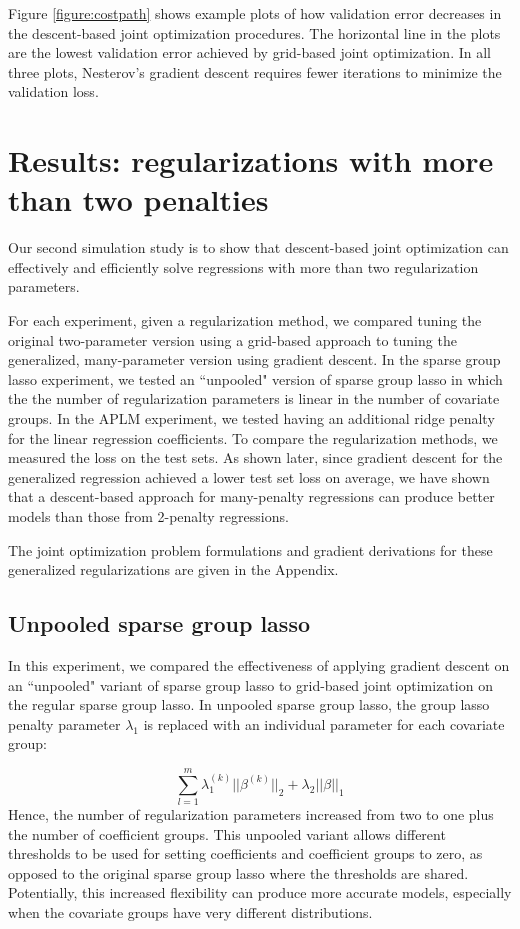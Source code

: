 \documentclass[10pt,letterpaper]{article}
\begin{document}
Figure \ref{figure:costpath} shows example plots of how validation error decreases in the descent-based joint optimization procedures. The horizontal line in the plots are the lowest validation error achieved by grid-based joint optimization. In all three plots, Nesterov's gradient descent requires fewer iterations to minimize the validation loss.

\section{Results: regularizations with more than two penalties}

Our second simulation study is to show that descent-based joint optimization can effectively and efficiently solve regressions with more than two regularization parameters.

For each experiment, given a regularization method, we compared tuning the original two-parameter version using a grid-based approach to tuning the generalized, many-parameter version using gradient descent. In the sparse group lasso experiment, we tested an ``unpooled" version of sparse group lasso in which the the number of regularization parameters is linear in the number of covariate groups. In the APLM experiment, we tested having an additional ridge penalty for the linear regression coefficients. To compare the regularization methods, we measured the loss on the test sets. As shown later, since gradient descent for the generalized regression achieved a lower test set loss on average, we have shown that a descent-based approach for many-penalty regressions can produce better models than those from 2-penalty regressions.

The joint optimization problem formulations and gradient derivations for these generalized regularizations are given in the Appendix.

\subsection{Unpooled sparse group lasso}

In this experiment, we compared the effectiveness of applying gradient descent on an ``unpooled" variant of sparse group lasso to grid-based joint optimization on the regular sparse group lasso. In unpooled sparse group lasso, the group lasso penalty parameter $\lambda_1$ is replaced with an individual parameter for each covariate group:

\begin{equation}
\sum_{l=1}^m \lambda_1^{(k)} \lvert\lvert \beta^{(k)} \rvert \rvert_2
+ \lambda_2 \lvert\lvert \beta \rvert \rvert_1
\end{equation}
Hence, the number of regularization parameters increased from two to one plus the number of coefficient groups. This unpooled variant allows different thresholds to be used for setting coefficients and coefficient groups to zero, as opposed to the original sparse group lasso where the thresholds are shared. Potentially, this increased flexibility can produce more accurate models, especially when the covariate groups have very different distributions.
\end{document}
